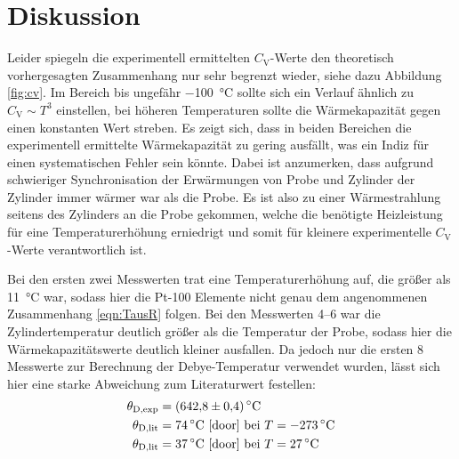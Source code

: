 \section{Diskussion}
\label{sec:Diskussion}

Leider spiegeln die experimentell ermittelten $C_\text{V}$-Werte den
theoretisch vorhergesagten Zusammenhang nur sehr begrenzt wieder, siehe
dazu Abbildung \ref{fig:cv}. Im Bereich bis ungefähr \SI{-100}{\celsius} sollte sich
ein Verlauf ähnlich zu $C_\text{V} \sim T^3$ einstellen, bei höheren
Temperaturen sollte die Wärmekapazität gegen einen konstanten Wert
streben. Es zeigt sich, dass in beiden Bereichen die experimentell
ermittelte Wärmekapazität zu gering ausfällt, was ein Indiz für einen
systematischen Fehler sein könnte. Dabei ist anzumerken, dass aufgrund
schwieriger Synchronisation der Erwärmungen von Probe und Zylinder
der Zylinder immer wärmer war als die Probe. Es ist also zu einer
Wärmestrahlung seitens des Zylinders an die Probe gekommen, welche die benötigte
Heizleistung für eine Temperaturerhöhung erniedrigt und somit für kleinere
experimentelle $C_\text{V}$-Werte verantwortlich ist.

Bei den ersten zwei Messwerten trat eine Temperaturerhöhung auf, die
größer als \SI{11}{\celsius} war, sodass hier die Pt-100 Elemente nicht
genau dem angenommenen Zusammenhang \eqref{eqn:TausR} folgen. Bei den Messwerten
\numrange{4}{6} war die Zylindertemperatur deutlich größer als die
Temperatur der Probe, sodass hier die Wärmekapazitätswerte deutlich kleiner
ausfallen. Da jedoch nur die ersten \num{8} Messwerte zur Berechnung der
Debye-Temperatur verwendet wurden, lässt sich hier eine starke Abweichung
zum Literaturwert festellen:
\begin{align*}
    \theta_\text{D,exp} &= \SI{642.8(4)}{\celsius} \\
    \theta_\text{D,lit} &= \SI{74}{\celsius} \text{ \cite{door} bei }T = \SI{-273}{\celsius} \\
    \theta_\text{D,lit} &= \SI{37}{\celsius} \text{ \cite{door} bei }T = \SI{27}{\celsius}
\end{align*}

